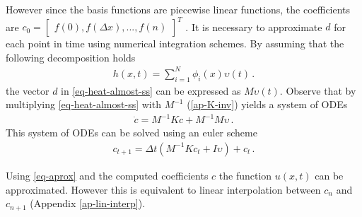 However since the basis functions are piecewise linear functions, the coefficients are \(c_0 = \begin{bmatrix}
f(0), f(\Delta x), ..., f(n)
\end{bmatrix}^T\)
\cite{Gustafsson2011g}.
It is necessary to approximate \(d\) for each point in time using numerical integration schemes.
By assuming that the following decomposition holds
\begin{gather}
h(x, t) = \sum_{i = 1}^{N} \phi_i(x) \upsilon(t) \,.
\end{gather}
the vector \(d\) in \ref{eq-heat-almost-ss} can be expressed as \(M\upsilon(t)\).
Observe that by multiplying \ref{eq-heat-almost-ss} with \(M^{-1}\) (\ref{ap-K-inv}) yields a system of ODEs
\begin{gather}
\dot{c} = M^{-1}Kc + M^{-1}M\upsilon \,. \label{almost-almost-ss}
\end{gather}
This system of ODEs can be solved using an euler scheme
\begin{gather}
c_{t+1} = \Delta t (M^{-1}Kc_{t} + I\upsilon) + c_{t} \,. \label{fem-euler}
\end{gather}

Using \ref{eq-aprox} and the computed coefficients \(c\) the function \(u(x,t)\) can be approximated.
However this is equivalent to linear interpolation between \(c_{n}\) and \(c_{n+1}\) (Appendix \ref{ap-lin-interp}).
